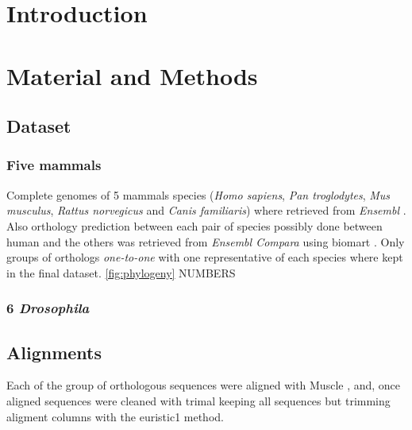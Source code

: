 

\section{Introduction}

\section{Material and Methods}

\subsection{Dataset}

\subsubsection{Five mammals}

Complete genomes of 5 mammals species (\textit{Homo sapiens},
\textit{Pan troglodytes}, \textit{Mus musculus}, \textit{Rattus norvegicus} and
\textit{Canis familiaris}) where retrieved from \textit{Ensembl}
\cite{Flicek2011}. Also orthology prediction between each pair of species
possibly done between human and the others was retrieved from
\textit{Ensembl Compara} \cite{Vilella2009} using biomart \cite{Kinsella2011}.
Only groups of orthologs \textit{one-to-one} with one representative of each
species where kept in the final dataset.
\ref{fig:phylogeny}
NUMBERS

\subsubsection{6 \textit{Drosophila}}

\subsection{Alignments}
Each of the group of orthologous sequences were aligned with Muscle
\cite{Edgar2004}, and, once aligned sequences were cleaned with trimal
\cite{Capella-Gutierrez2009} keeping all sequences but trimming aligment columns
with the euristic1 method.


